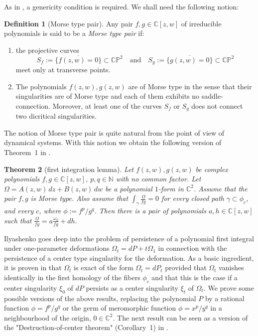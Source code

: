 \documentclass[11pt,a4paper]{amsart}
\newtheorem{theorem}{Theorem}[section]
\theoremstyle{definition}
\newtheorem{definition}[theorem]{Definition}
\begin{document}
As in \cite{Ilyashenko}, a genericity condition is required. We shall need the following notion:
\begin{definition}[Morse type pair]
\label{definition:*generic}
Any pair $f,g \in \mathbb C[z,w]$ of irreducible polynomials  is said to be a  {\it Morse type pair} if:
\begin{enumerate}
\item[{\rm($\mathcal M.1$)}] the projective curves
\[
S_f:=\overline{\{f(z,w)=0\}}\subset\mathbb{CP}^2
\quad\text{and}\quad
S_g:=\overline{\{g(z,w)=0\}}\subset\mathbb{CP}^2
\]
 meet only at transverse
points.

\item[{\rm($\mathcal M.2$)}] The polynomials $f(z,w),g(z,w)$ are
{of   Morse type} in the sense that their
singularities are of Morse type and
each of them exhibits no saddle-connection. Moreover, 
at least one of the curves $S_f$ or $S_g$ does not connect two dicritical
singularities.
\end{enumerate}


\end{definition}

The notion of Morse type  pair is quite natural from the point of view of dynamical systems. With this notion we obtain the following version of Theorem~1 in \cite{Ilyashenko}.

\begin{theorem}[first integration lemma]
\label{theorem:firsintegration}
Let $f(z,w), g(z,w)$ be complex polynomials
$f,g\in\mathbb{C}[z,w]$, $p, q \in \mathbb N$ with no common factor.
Let $\Omega = A(z,w)\,dz + B(z,w)\,dw$
be a polynomial $1$-form in $\mathbb{C}^2$. 
Assume that the pair $f,g$ is Morse type. 
Also assume that $\int_\gamma \frac{\Omega}{f g}=0
$
for every closed path $\gamma\subset\phi_c$,
and every $c$, where $\phi:=f^p/g^q$.
Then there is a pair of polynomials
$a,h\in\mathbb{C}[z,w]$
such that
$\frac{\Omega}{f g}
=
a \frac{\omega_0}{fg} + dh.
$
\end{theorem}






 Ilyashenko goes deep   into the problem of persistence of a polynomial first integral
under one-parameter deformations
$
\Omega_t=dP+t\Omega_1
$
in connection with the persistence of a center type singularity for the deformation.
As a basic ingredient, it is proven in \cite{Ilyashenko} that $\Omega_t$ is exact of
the form $\Omega_t=dP_t$ provided that $\Omega_t$ vanishes identically in the first
homology of the fibers $\phi_c$ and that this is the case if a center singularity
$\xi_0$ of $dP$ persists as a center singularity $\xi_t$ of $\Omega_t$.
We prove some possible versions of the above results, replacing the polynomial
$P$ by a rational function $\phi=f^p/g^q$ or the germ of
meromorphic function  $\phi = x^p / y^q $ in a neighbourhood of the origin, $0 \in \mathbb{C}^2.$
The next result can be seen as a version of the "Destruction-of-center theorem" (Corollary~1) in \cite{Ilyashenko}.
\end{document}

